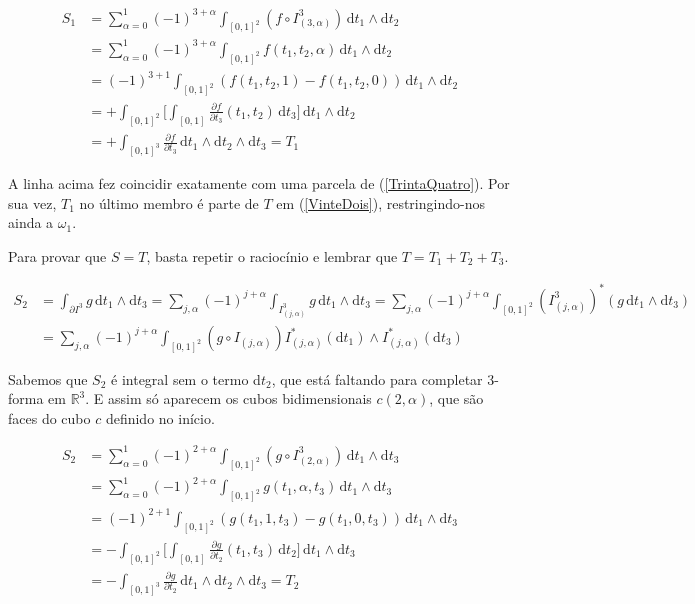 \documentclass[12pt,a4paper]{article}
\begin{document}
		\begin{align}
			S_1 &= \sum_{\alpha = 0}^1 (-1)^{3 + \alpha} \int_{[0,1]^2} (f \circ I^3_{(3, \alpha)}) \,\mathrm{d}t_1 \wedge \mathrm{d}t_2 \\
			&= \sum_{\alpha = 0}^1 (-1)^{3 + \alpha} \int_{[0,1]^2} f(t_1, t_2, \alpha) \,\mathrm{d}t_1 \wedge \mathrm{d}t_2 \\
			&= (-1)^{3 + 1} \int_{[0,1]^2} (f(t_1, t_2, 1) - f(t_1, t_2, 0)) \,\mathrm{d}t_1 \wedge \mathrm{d}t_2 \\
			&= + \int_{[0,1]^2} \biggl[ \int_{[0,1]} \frac{\partial f}{\partial t_3} (t_1, t_2) \,\mathrm{d}t_3 \biggl] \,\mathrm{d}t_1 \wedge \mathrm{d}t_2 \\
			&= + \int_{[0,1]^3} \frac{\partial f}{\partial t_3} \,\mathrm{d}t_1 \wedge \mathrm{d}t_2 \wedge \mathrm{d}t_3 = T_1
		\end{align}

		A linha acima fez coincidir exatamente com uma parcela de (\ref{TrintaQuatro}). Por sua vez, $T_1$ no \'ultimo membro \'e parte de $T$ em (\ref{VinteDois}), restringindo-nos ainda a $\omega_1$.

		Para provar que $S = T$, basta repetir o racioc\'inio e lembrar que $T = T_1 + T_2 + T_3$.

		\begin{align}
			S_2 &= \int_{\partial I^3} g \,\mathrm{d}t_1 \wedge \mathrm{d}t_3 = \sum_{j, \alpha} (-1)^{j + \alpha} \int_{I^3_{(j, \alpha)}} g \,\mathrm{d}t_1 \wedge \mathrm{d}t_3 = \sum_{j, \alpha} (-1)^{j + \alpha} \int_{[0,1]^2} (I_{(j, \alpha)}^{3})^* (g \,\mathrm{d}t_1 \wedge \mathrm{d}t_3) \\
			&= \sum_{j, \alpha} (-1)^{j + \alpha} \int_{[0,1]^2} (g \circ I_{(j, \alpha)}) I^*_{(j, \alpha)} (\mathrm{d}t_1) \wedge I^*_{(j, \alpha)} (\mathrm{d}t_3)
		\end{align}

		Sabemos que $S_2$ \'e integral sem o termo d$t_2$, que est\'a faltando para completar 3-forma em $\mathbb{R}^3$. E assim s\'o aparecem os cubos bidimensionais $c(2, \alpha)$, que s\~ao faces do cubo $c$ definido no in\'icio.

		\begin{align}
			S_2 &= \sum_{\alpha = 0}^1 (-1)^{2 + \alpha} \int_{[0,1]^2} (g \circ I^3_{(2, \alpha)}) \,\mathrm{d}t_1 \wedge \mathrm{d}t_3 \\
			&= \sum_{\alpha = 0}^1 (-1)^{2 + \alpha} \int_{[0,1]^2} g(t_1, \alpha, t_3) \,\mathrm{d}t_1 \wedge \mathrm{d}t_3 \\
			&= (-1)^{2 + 1} \int_{[0,1]^2} (g(t_1, 1, t_3) - g(t_1, 0, t_3)) \,\mathrm{d}t_1 \wedge \mathrm{d}t_3 \\
			&= - \int_{[0,1]^2} \biggl[ \int_{[0,1]} \frac{\partial g}{\partial t_2} (t_1, t_3) \,\mathrm{d}t_2 \biggl] \,\mathrm{d}t_1 \wedge \mathrm{d}t_3 \\
			&= - \int_{[0,1]^3} \frac{\partial g}{\partial t_2} \,\mathrm{d}t_1 \wedge \mathrm{d}t_2 \wedge \mathrm{d}t_3 = T_2
		\end{align}
\end{document}

